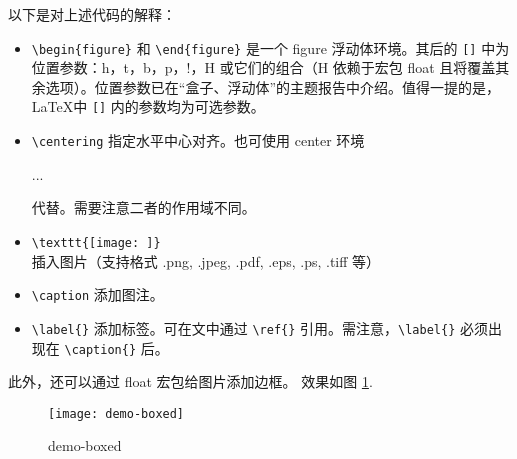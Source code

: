 以下是对上述代码的解释：
\begin{itemize}
  \item \verb+\begin{figure}+ 和 \verb+\end{figure}+ 是一个 figure 浮动体环境。其后的 \verb+[]+ 中为位置参数：h，t，b，p，!，H 或它们的组合（H 依赖于宏包 float 且将覆盖其余选项）。位置参数已在“盒子、浮动体”的主题报告中介绍。值得一提的是，\LaTeX 中 \verb+[]+ 内的参数均为可选参数。
  \item \verb+\centering+ 指定水平中心对齐。也可使用 center 环境 \\
    \begin{texlst}[numbers=none]
    \begin{center}
    ...
    \end{center}
    \end{texlst}
    代替。需要注意二者的作用域不同。
  \item \verb+\texttt{[image: ]}+ 插入图片（支持格式 .png, .jpeg, .pdf, .eps, .ps, .tiff 等）
  \item \verb+\caption+ 添加图注。
  \item \verb+\label{}+ 添加标签。可在文中通过 \verb+\ref{}+ 引用。需注意，\verb+\label{}+ 必须出现在 \verb+\caption{}+ 后。
\end{itemize}

此外，还可以通过 float 宏包给图片添加边框。
效果如图 \ref{demo-boxed}.
\begin{figure}[]
  \centering
  \texttt{[image: demo-boxed]}
  \caption{demo-boxed}
  \label{demo-boxed}
\end{figure}
